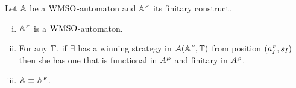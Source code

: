 \begin{theorem}\label{PROP_facts_finConstrwmso} Let $\mathbb{A}$ be a $\mathrm{WMSO}$-automaton and $\mathbb{A}^{{\scriptscriptstyle F}}$ its finitary construct.
\begin{enumerate}[(i)]
   pt
  \item $\mathbb{A}^{{\scriptscriptstyle F}}$ is a $\mathrm{WMSO}$-automaton.\label{point:finConstrAut}
  \item For any $\mathbb{T}$, if $\exists$ has a winning strategy in $\mathcal{A}(\mathbb{A}^{{\scriptscriptstyle F}},\mathbb{T})$ from position $(a_I^{{\scriptscriptstyle F}},s_I)$ then she has one that is functional in $A^{\wp}$ and finitary in $A^{\wp}$.%
  \label{point:finConstrStrategy}
  \item $\mathbb{A} \equiv \mathbb{A}^{{\scriptscriptstyle F}}$. \label{point:finConstrEquiv}
  \end{enumerate}
\end{theorem}
